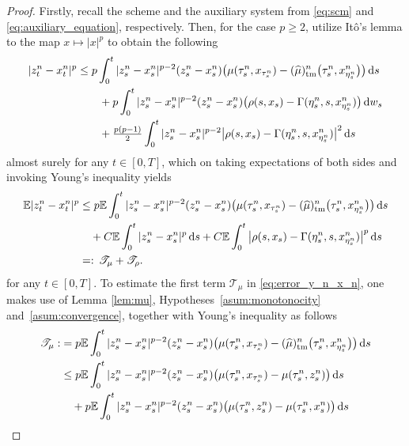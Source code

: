 \documentclass[reqno,  oneside, 12pt]{amsart}
\newcommand{\E}{\mathbb E}
\begin{document}
\begin{proof}
	Firstly, recall the scheme and the  auxiliary system from \eqref{eq:scm} and  \eqref{eq:auxiliary_equation}, respectively. Then, for the case \(p\geq 2\), utilize  It\^o's  lemma \cite[Theorem 94]{Situ2006} to the map \( x \mapsto |x|^p \) to obtain the following
	\begin{align} 
		|z_t^n-x_t^{n}|^{p}&\leq {p}\int_{0}^{t}|z_s^n-x_s^{n}|^{{p}-2}(z_s^n-x_s^{n})\big(\mu(\tau^n_s,x_{\tau^n_s})-(\widehat\mu)_{\mathrm{tm}}^{n}\big(\tau^n_s,x_{\eta^n_s}^{n}\big)\big)\,\mathrm{d}s  \notag
		\\
		&\qquad+p\int_{0}^{t}|z_s^n-x_s^{n}|^{{p}-2}(z_s^n-x_s^{n})\big(\rho(s, x_s)-  \Gamma(\eta^n_s,s,x_{\eta^n_s}^{n})\big)\,\mathrm{d}w_s  \notag
		\\
		& \qquad+\tfrac{p(p-1)}{2}\int_{0}^{t}|z_s^n-x_s^{n}|^{{p}-2}\big|\rho(s, x_s)-  \Gamma(\eta^n_s,s,x_{\eta^n_s}^{n})\big|^2 \,\mathrm{d}s \notag %
	\end{align}
	almost surely for any $t\in[0,T]$, which on taking expectations of both sides and invoking Young's inequality yields 
	\begin{align} \label{eq:error_y_n_x_n}
		\E|z_t^n-x_t^{n}|^{p}
		&\leq 
		p\E\int_{0}^{t}|z_s^n-x_s^{n}|^{{p}-2}(z_s^n-x_s^{n})\big(\mu(\tau^n_s, x_{\tau^n_s})-(\widehat\mu)_{\mathrm{tm}}^{n}\big(\tau^n_s,x_{\eta^n_s}^{n}\big)\big)\,\mathrm{d}s \notag
		\\
		&
		\quad+C\E\int_{0}^{t}|z_s^n-x_s^{n}|^{{p}}\,\mathrm{d}s 
		+C\E\int_{0}^{t}\big|\rho(s, x_s)-  \Gamma(\eta^n_s,s,x_{\eta^n_s}^{n})\big|^p\,\mathrm{d}s \notag
		\\
		&=:  \, \mathscr{T}_\mu +\mathscr{T}_\rho.
	\end{align}
	for any $t\in[0,T]$. 
	To estimate the first term $\mathscr{T}_\mu$ in \eqref{eq:error_y_n_x_n}, one makes use of Lemma \ref{lem:mu}, Hypotheses~\ref{asum:monotonocity} and~\ref{asum:convergence}, together with Young's inequality as follows
	\begin{align}
		\mathscr{T}_\mu: &= p\E\int_{0}^{t}|z_s^n-x_s^{n}|^{{p}-2}(z_s^n-x_s^{n})\big(\mu(\tau^n_s, x_{\tau^n_s})-(\widehat\mu)_{\mathrm{tm}}^{n}\big(\tau^n_s,x_{\eta^n_s}^{n}\big)\big)\,\mathrm{d}s \notag
		\\
		&\leq  p\E\int_{0}^{t}|z_s^n-x_s^{n}|^{{p}-2}(z_s^n-x_s^{n})\big(\mu(\tau^n_s,x_{\tau^n_s})-\mu( \tau^n_s, z_{s}^n)\big)\,\mathrm{d}s \notag
		\\
		&\quad+ p\E\int_{0}^{t}|z_s^n-x_s^{n}|^{{p}-2}(z_s^n-x_s^{n})\big(\mu( \tau^n_s, z_{s}^n)-\mu(\tau^n_s,  x_{s}^n)\big)\,\mathrm{d}s \notag

\end{align}
\end{proof}
\end{document}
